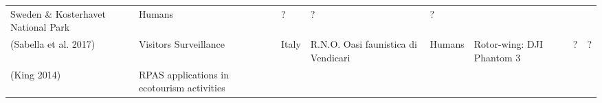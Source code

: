 \documentclass[]{interact}
\theoremstyle{plain}%
\theoremstyle{definition}
\theoremstyle{remark}
\begin{document}
\begin{longtable}[]{@{}llllllll@{}}
\begin{minipage}[t]{0.14\columnwidth}
Sweden \& Kosterhavet National Park\strut
\end{minipage} & \begin{minipage}[t]{0.10\columnwidth}\raggedright\strut
Humans\strut
\end{minipage} & \begin{minipage}[t]{0.09\columnwidth}\raggedright\strut
?\strut
\end{minipage} & \begin{minipage}[t]{0.11\columnwidth}\raggedright\strut
?\strut
\end{minipage} & \begin{minipage}[t]{0.01\columnwidth}\raggedright\strut
?\strut
\end{minipage}\tabularnewline
\begin{minipage}[t]{0.11\columnwidth}\raggedright\strut
(Sabella et al. 2017)\strut
\end{minipage} & \begin{minipage}[t]{0.18\columnwidth}\raggedright\strut
Visitors Surveillance\strut
\end{minipage} & \begin{minipage}[t]{0.03\columnwidth}\raggedright\strut
Italy\strut
\end{minipage} & \begin{minipage}[t]{0.14\columnwidth}\raggedright\strut
R.N.O. Oasi faunistica di Vendicari\strut
\end{minipage} & \begin{minipage}[t]{0.10\columnwidth}\raggedright\strut
Humans\strut
\end{minipage} & \begin{minipage}[t]{0.09\columnwidth}\raggedright\strut
Rotor-wing: DJI Phantom 3\strut
\end{minipage} & \begin{minipage}[t]{0.11\columnwidth}\raggedright\strut
?\strut
\end{minipage} & \begin{minipage}[t]{0.01\columnwidth}\raggedright\strut
?\strut
\end{minipage}\tabularnewline
\begin{minipage}[t]{0.11\columnwidth}\raggedright\strut
(King 2014)\strut
\end{minipage} & \begin{minipage}[t]{0.18\columnwidth}\raggedright\strut
RPAS applications in ecotourism activities\strut
\end{minipage} & \begin{minipage}[t]{0.03\columnwidth}\raggedright\strut

\end{minipage}
\end{longtable}
\end{document}
